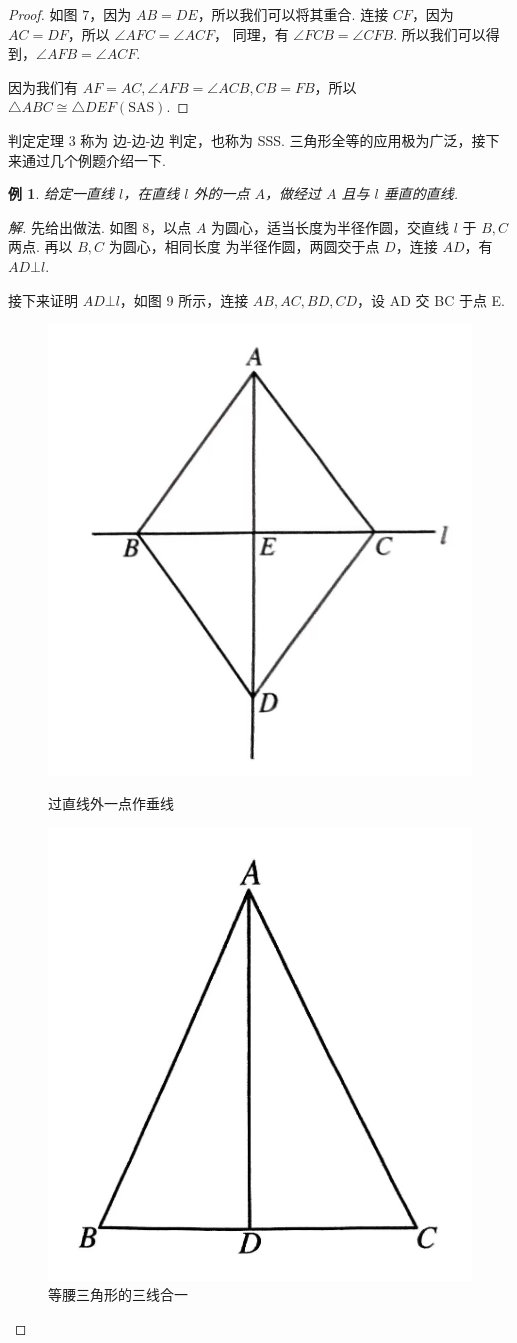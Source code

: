 \documentclass[a4paper]{article}
\newtheorem{exam}{例}[subsection]
\begin{document}
\begin{proof}
    如图 $7$，因为 $AB=DE$，所以我们可以将其重合. 连接 $CF$，因为 $AC=DF$，所以 $\angle AFC=\angle ACF$，
    同理，有 $\angle FCB=\angle CFB$. 所以我们可以得到，$\angle AFB=\angle ACF$.

    因为我们有 $AF=AC,\angle AFB=\angle ACB,CB=FB$，所以 $\triangle ABC \cong \triangle DEF(\text{SAS})$.
\end{proof}

判定定理 3 称为 边-边-边 判定，也称为 SSS. 三角形全等的应用极为广泛，接下来通过几个例题介绍一下.

\begin{exam}
    给定一直线 $l$，在直线 $l$ 外的一点 $A$，做经过 $A$ 且与 $l$ 垂直的直线.
\end{exam}

\begin{proof}[解]
    先给出做法. 如图 $8$，以点 $A$ 为圆心，适当长度为半径作圆，交直线 $l$ 于 $B,C$ 两点. 再以 $B,C$ 为圆心，相同长度
    为半径作圆，两圆交于点 $D$，连接 $AD$，有 $AD\bot l$.

    接下来证明 $AD \bot l$，如图 9 所示，连接 $AB,AC,BD,CD$，设 AD 交 BC 于点 E.

    \begin{figure}[htbp]
        \begin{minipage}{0.4\textwidth}
            \centering
            \includegraphics[width=0.5\linewidth]{Pictures/O2-3.jpg}
            \caption{过直线外一点作垂线}
        \end{minipage}
        \centering
        \begin{minipage}{0.4\textwidth}
            \centering
            \includegraphics[width=0.5\linewidth]{Pictures/O2-4.jpg}
            \caption{等腰三角形的三线合一}
        \end{minipage}
    \end{figure}


\end{proof}
\end{document}
